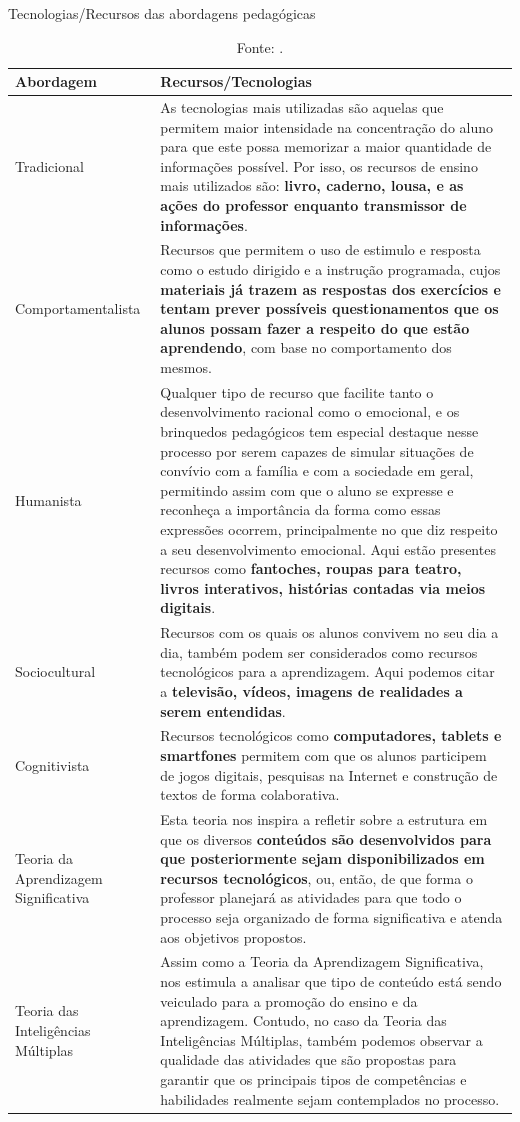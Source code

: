 \begin{table}[htbp]
\caption{Tecnologias/Recursos das abordagens pedagógicas}
\label{tab:abordagens-pedagogicas:tecnologia}
\begin{tabularx}{\textwidth}{p{3.5cm}|X} \hline
\textbf{Abordagem} & \textbf{Recursos/Tecnologias} \\ \hline
Tradicional & As tecnologias mais utilizadas são aquelas que permitem maior intensidade na concentração do aluno para que este possa memorizar a maior quantidade de informações possível. Por isso, os recursos de ensino mais utilizados são: \textbf{livro, caderno, lousa, e as ações do professor enquanto transmissor de informações}. \\ \hline
Comportamentalista & Recursos que permitem o uso de estimulo e resposta como o estudo dirigido e a instrução programada, cujos \textbf{materiais já trazem as respostas dos exercícios e tentam prever possíveis questionamentos que os alunos possam fazer a respeito do que estão aprendendo}, com base no comportamento dos mesmos. \\ \hline
Humanista & Qualquer tipo de recurso que facilite tanto o desenvolvimento racional como o emocional, e os brinquedos pedagógicos tem especial destaque nesse processo por serem capazes de simular situações de convívio com a família e com a sociedade em geral, permitindo assim com que o aluno se expresse e reconheça a importância da forma como essas expressões ocorrem, principalmente no que diz respeito a seu desenvolvimento emocional. Aqui estão presentes recursos como \textbf{fantoches, roupas para teatro, livros interativos, histórias contadas via meios digitais}. \\ \hline
Sociocultural & Recursos com os quais os alunos convivem no seu dia a dia, também podem ser considerados como recursos tecnológicos para a aprendizagem. Aqui podemos citar a \textbf{televisão, vídeos, imagens de realidades a serem entendidas}. \\ \hline
Cognitivista & Recursos tecnológicos como \textbf{computadores, tablets e smartfones} permitem com que os alunos participem de jogos digitais, pesquisas na Internet e construção de textos de forma colaborativa. \\ \hline
Teoria da Aprendizagem Significativa & Esta teoria nos inspira a refletir sobre a estrutura em que os diversos \textbf{conteúdos são desenvolvidos para que posteriormente sejam disponibilizados em recursos tecnológicos}, ou, então, de que forma o professor planejará as atividades para que todo o processo seja organizado de forma significativa e atenda aos objetivos propostos. \\ \hline
Teoria das Inteligências Múltiplas & Assim como a Teoria da Aprendizagem Significativa, nos estimula a analisar que tipo de conteúdo está sendo veiculado para a promoção do ensino e da aprendizagem. Contudo, no caso da Teoria das Inteligências Múltiplas, também podemos observar a qualidade das atividades que são propostas para garantir que os principais tipos de competências e habilidades realmente sejam contemplados no processo. \\ \hline
\end{tabularx}
\caption*{Fonte: .}
\end{table}

